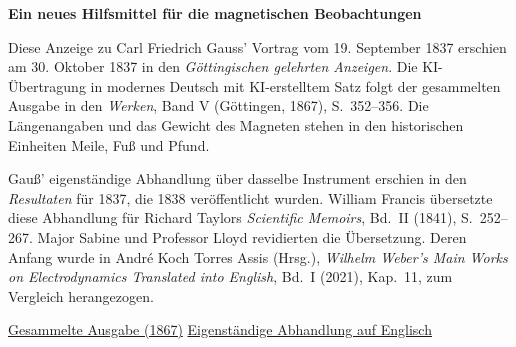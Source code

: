 \clearpage
\thispagestyle{empty}
\begin{center}\Large\textbf{Ein neues Hilfsmittel für die magnetischen Beobachtungen}\end{center}

Diese Anzeige zu Carl Friedrich Gauss' Vortrag vom 19. September 1837 erschien am 30. Oktober 1837 in den \textit{Göttingischen gelehrten Anzeigen}. Die KI-Übertragung in modernes Deutsch mit KI-erstelltem Satz folgt der gesammelten Ausgabe in den \textit{Werken}, Band V (Göttingen, 1867), S.~352--356. Die Längenangaben und das Gewicht des Magneten stehen in den historischen Einheiten Meile, Fuß und Pfund.

\medskip\noindent
Gauß' eigenständige Abhandlung über dasselbe Instrument erschien in den \textit{Resultaten} für 1837, die 1838 veröffentlicht wurden. William Francis übersetzte diese Abhandlung für Richard Taylors \textit{Scientific Memoirs}, Bd.~II (1841), S.~252--267. Major Sabine und Professor Lloyd revidierten die Übersetzung. Deren Anfang wurde in André Koch Torres Assis (Hrsg.), \textit{Wilhelm Weber's Main Works on Electrodynamics Translated into English}, Bd.~I (2021), Kap.~11, zum Vergleich herangezogen.

\medskip\noindent
\href{https://gdz.sub.uni-goettingen.de/id/PPN236006339}{Gesammelte Ausgabe (1867)}\quad
\href{https://www.ifi.unicamp.br/~assis/Weber-in-English-Vol-1.pdf\#page=126}{Eigenständige Abhandlung auf Englisch}
\clearpage
